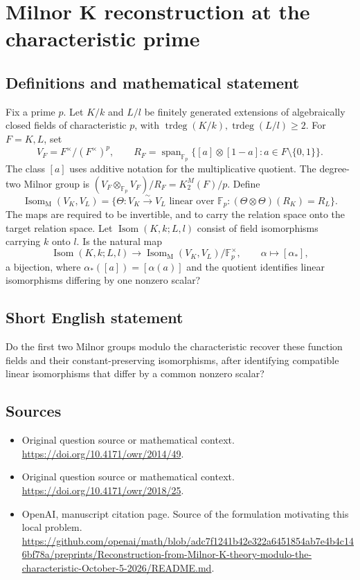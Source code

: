 \documentclass[11pt]{article}
\begin{document}
\section*{Milnor K reconstruction at the characteristic prime}\label{statement}
\subsection{Definitions and mathematical statement}
Fix a prime $p$. Let $K/k$ and $L/l$ be finitely generated extensions of algebraically closed fields of characteristic $p$, with $\operatorname{trdeg}(K/k),\operatorname{trdeg}(L/l)\ge2$. For $F=K,L$, set
\[
 V_F=F^\times/(F^\times)^p,\qquad
 R_F=\operatorname{span}_{\mathbb F_p}\{[a]\otimes[1-a]:a\in F\setminus\{0,1\}\}.
\]
The class $[a]$ uses additive notation for the multiplicative quotient. The degree-two Milnor group is $(V_F\otimes_{\mathbb F_p}V_F)/R_F=K_2^M(F)/p$. Define
\[
 \operatorname{Isom}_{\mathrm M}(V_K,V_L)
 =\{\Theta:V_K\xrightarrow{\sim}V_L\text{ linear over }\mathbb F_p:
           (\Theta\otimes\Theta)(R_K)=R_L\}.
\]
The maps are required to be invertible, and to carry the relation space onto the target relation space. Let $\operatorname{Isom}(K,k;L,l)$ consist of field isomorphisms carrying $k$ onto $l$. Is the natural map
\[
 \operatorname{Isom}(K,k;L,l)\longrightarrow
 \operatorname{Isom}_{\mathrm M}(V_K,V_L)/\mathbb F_p^\times,
 \qquad\alpha\longmapsto[\alpha_*],
\]
a bijection, where $\alpha_*([a])=[\alpha(a)]$ and the quotient identifies linear isomorphisms differing by one nonzero scalar?

\subsection{Short English statement}
Do the first two Milnor groups modulo the characteristic recover these function fields and their constant-preserving isomorphisms, after identifying compatible linear isomorphisms that differ by a common nonzero scalar?

\subsection{Sources}
\begin{itemize}
\item[S1] Original question source or mathematical context.
\url{https://doi.org/10.4171/owr/2014/49}.
\item[S2] Original question source or mathematical context.
\url{https://doi.org/10.4171/owr/2018/25}.
\item[S3] OpenAI, manuscript citation page. Source of the formulation motivating this local problem.
\url{https://github.com/openai/math/blob/adc7f1241b42e322a6451854ab7e4b4c146bf78a/preprints/Reconstruction-from-Milnor-K-theory-modulo-the-characteristic-October-5-2026/README.md}.
\end{itemize}
\end{document}

